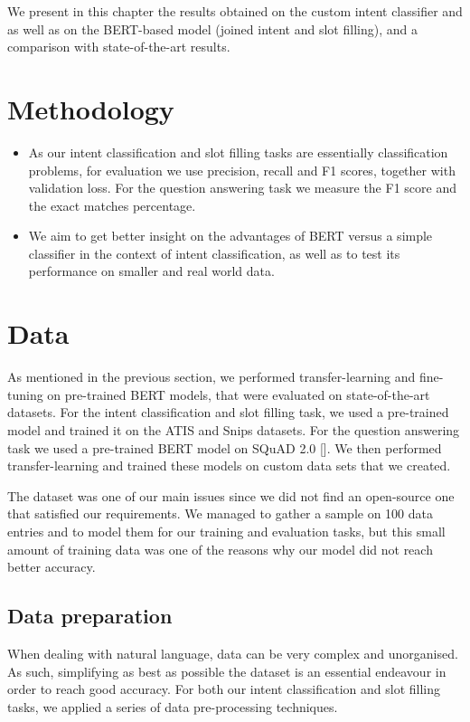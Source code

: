 \documentclass[runningheads,a4paper,11pt]{report}
\begin{document}
We present in this chapter the results obtained on the custom intent classifier and as well as on the BERT-based model (joined intent and slot filling), and a comparison with state-of-the-art results.

\section{Methodology}
\label{section:methodology}

\begin{itemize}
	\item As our intent classification and slot filling tasks are essentially classification problems, for evaluation we use precision, recall and F1 scores, together with validation loss. For the question answering task we measure the F1 score and the exact matches percentage.
	\item We aim to get better insight on the advantages of BERT versus a simple classifier in the context of intent classification, as well as to test its performance on smaller and real world data.
\end{itemize}


\section{Data}
\label{section:data}

As mentioned in the previous section, we performed transfer-learning and fine-tuning on pre-trained BERT models, that were evaluated on state-of-the-art datasets. For the intent classification and slot filling task, we used a pre-trained model and trained it on the ATIS \cite{gok10} and Snips \cite{ali16} datasets. For the question answering task we used a pre-trained BERT model on SQuAD 2.0 []. We then performed transfer-learning and trained these models on custom data sets that we created.

The dataset was one of our main issues since we did not find an open-source one that satisfied our requirements. We managed to gather a sample on 100 data entries and to model them for our training and evaluation tasks, but this small amount of training data was one of the reasons why our model did not reach better accuracy.

\subsection{Data preparation}
\label{section:dataprep}

When dealing with natural language, data can be very complex and unorganised. As such, simplifying as best as possible the dataset is an essential endeavour in order to reach good accuracy. For both our intent classification and slot filling tasks, we applied a series of data pre-processing techniques.
\end{document}
